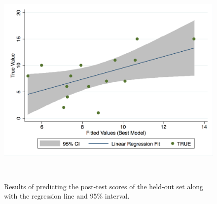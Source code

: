 \documentclass{sigchi}
\begin{document}
	
	\begin{figure}
		\centering
		\includegraphics[width=0.9\columnwidth]{figures/regression.png}
		\caption{Results of predicting the post-test scores of the held-out set along with the regression line and 95\% interval.}~\label{fig:regression}
	\end{figure}
	
\end{document}
